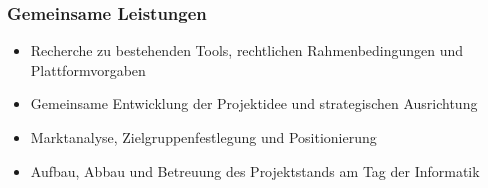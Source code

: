 \documentclass[a4paper,12pt]{article}
\begin{document}
\subsubsection*{Gemeinsame Leistungen}

\begin{itemize}
    \item Recherche zu bestehenden Tools, rechtlichen Rahmenbedingungen und Plattformvorgaben
    \item Gemeinsame Entwicklung der Projektidee und strategischen Ausrichtung
    \item Marktanalyse, Zielgruppenfestlegung und Positionierung
    \item Aufbau, Abbau und Betreuung des Projektstands am Tag der Informatik
\end{itemize}
\end{document}
